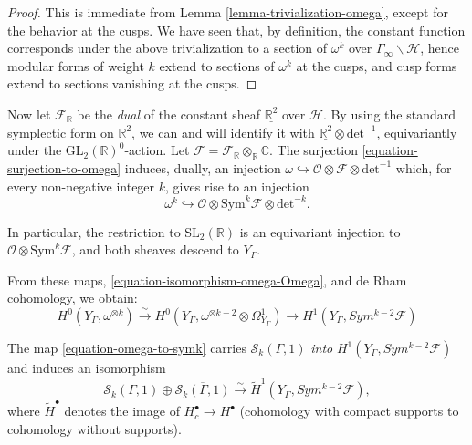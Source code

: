 \begin{proof}
This is immediate from Lemma \ref{lemma-trivialization-omega}, except for the behavior at the cusps. We have seen that, by definition, the constant function corresponds under the above trivialization to a section of $\omega^k$ over $\Gamma_\infty\backslash \mathcal H$, hence modular forms of weight $k$ extend to sections of $\omega^k$ at the cusps, and cusp forms extend to sections vanishing at the cusps. 
\end{proof}

Now let $\mathcal F_{\mathbb R}$ be the \emph{dual} of the constant sheaf $\underline{\mathbb R^2}$ over $\mathcal H$. By using the standard symplectic form on $\mathbb R^2$, we can and will identify it with $\underline{\mathbb R^2} \otimes \text{det}^{-1}$, equivariantly under the $\text{GL}_2(\mathbb R)^0$-action. Let $\mathcal F = \mathcal F_{\mathbb R}\otimes_{\mathbb R} \mathbb C$. The surjection \eqref{equation-surjection-to-omega} induces, dually, an injection $\omega \hookrightarrow \mathcal O\otimes \mathcal F \otimes \text{det}^{-1}$ which, for every non-negative integer $k$, gives rise to an injection 
\begin{equation}
 \label{equation-omegak-injection} 
\omega^k \hookrightarrow \mathcal O\otimes \text{Sym}^k\mathcal F \otimes \text{det}^{-k}.
\end{equation}

In particular, the restriction to $\text{SL}_2(\mathbb R)$ is an equivariant injection to $\mathcal O\otimes \text{Sym}^k\mathcal F$, and both sheaves descend to $Y_\Gamma$. 

From these maps, \eqref{equation-isomorphism-omega-Omega}, and de Rham cohomology, we obtain: 
\begin{equation}
\label{equation-omega-to-symk}
H^{0}(Y_{\Gamma}, \omega^{\otimes k}) \xrightarrow\sim H^{0}(Y_{\Gamma}, \omega^{\otimes k-2} \otimes \Omega^{1}_{Y_{\Gamma}}) \to H^{1}(Y_{\Gamma}, Sym^{k-2}\mathcal{F})
\end{equation}

\begin{theorem}
\label{theorem-Shimura-isomorphism}
	The map \eqref{equation-omega-to-symk} carries $\mathcal{S}_{k}(\Gamma, 1)$ \emph{into} $H^{1}(Y_{\Gamma}, Sym^{k-2}\mathcal{F})$ and induces an isomorphism 
\begin{equation}
\label{equation-shimura-isomorphism}	 
\mathcal{S}_{k}(\Gamma, 1) \oplus \overline{\mathcal{S}_{k}(\Gamma, 1)} \xrightarrow\sim \tilde{H}^{1}(Y_{\Gamma}, Sym^{k-2}\mathcal{F}),\end{equation}
where $\tilde{H}^\bullet$ denotes the image of $H_c^\bullet \to H^\bullet$ (cohomology with compact supports to cohomology without supports).
\end{theorem}


